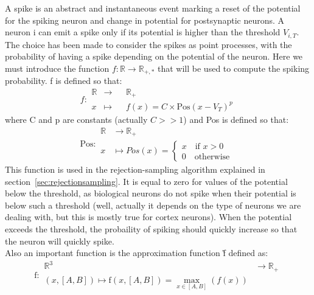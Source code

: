 	A spike is an abstract and instantaneous event marking a reset of the potential for the spiking neuron and change in potential for postsynaptic neurons. A neuron i can emit a spike only if its potential is higher than the threshold $V_{i,T}$. The choice has been made to consider the spikes as point processes, with the probability of having a spike depending on the potential of the neuron. Here we must introduce the function $f:\mathbb{R}\to\mathbb{R}_{+,*}$ that will be used to compute the spiking probability. f is defined so that:\\\indent
	\begin{equation*}
		f:	\begin{aligned}
				\mathbb{R}&\to&&\mathbb{R}_{+}\\
				x&\mapsto&&f(x)=C\times\text{Pos}(x-V_T)^p
			\end{aligned}
	\end{equation*}
	where C and p are constants (actually $C>>1$) and Pos is defined so that:
	\begin{equation*}
		\text{Pos}:	\begin{aligned}
						\mathbb{R}&\to\mathbb{R}_+\\
						x&\mapsto Pos(x)=	\begin{cases}
												x\quad\text{if }x>0\\
												0\quad\text{otherwise}
											\end{cases}
					\end{aligned}
	\end{equation*}
	This function is used in the rejection-sampling algorithm explained in section~\ref{sec:rejectionsampling}. It is equal to zero for values of the potential below the threshold, as biological neurons do not spike when their potential is below such a threshold (well, actually it depends on the type of neurons we are dealing with, but this is mostly true for cortex neurons). When the potential exceeds the threshold, the probaility of spiking should quickly increase so that the neuron will quickly spike.\\\indent
	Also an important function is the approximation function \~f defined as:
	\begin{equation*}
		\text{\~f}:	\begin{aligned}
						\mathbb{R}^3&\to\mathbb{R}_+\\
						(x,[A,B])\mapsto\text{\~f}(x,[A,B])=\max_{x\in[A,B]}(f(x))
					\end{aligned}
	\end{equation*}
